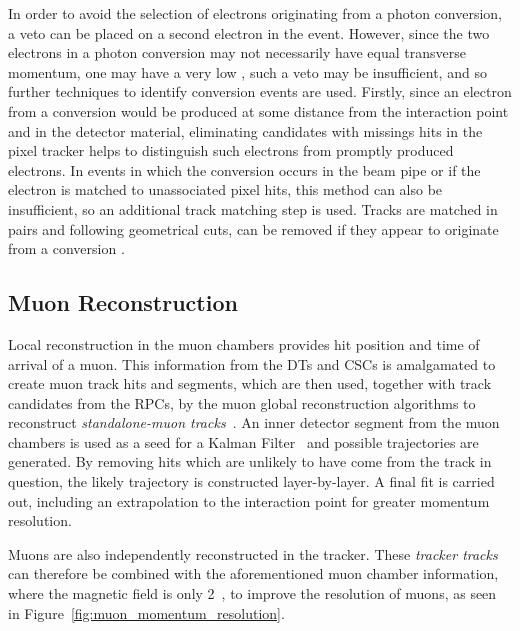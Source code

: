 In order to avoid the selection of electrons originating from a photon conversion, a veto can be placed on a
second electron in the event. However, since the two electrons in a photon conversion may not necessarily have
equal transverse momentum, \ie one may have a very low \pt, such a veto may be insufficient, and so further
techniques to identify conversion events are used. Firstly, since an electron from a conversion would be
produced at some distance from the interaction point and in the detector material, eliminating candidates with
missings hits in the pixel tracker helps to distinguish such electrons from promptly produced electrons. In
events in which the conversion occurs in the beam pipe or if the electron is matched to unassociated pixel
hits, this method can also be insufficient, so an additional track matching step is used. Tracks are matched
in pairs and following geometrical cuts, can be removed if they appear to originate from a conversion
\cite{electron_reconstruction}.

\subsection{Muon Reconstruction}
\label{ss:muon_reconstruction}
Local reconstruction in the muon chambers provides hit position and time of arrival of a muon. This
information from the DTs and CSCs is amalgamated to create muon track hits and segments, which are then used,
together with track candidates from the RPCs, by the muon global reconstruction algorithms to reconstruct
\textit{standalone-muon tracks}~\cite{muon_reconstruction}. An inner detector segment from the muon chambers
is used as a seed for a Kalman Filter~\cite{kalman_filter, Speer:927395} and possible trajectories are generated. By removing hits
which are unlikely to have come from the track in question, the likely trajectory is constructed
layer-by-layer. A final fit is carried out, including an extrapolation to the interaction point for greater
momentum resolution.

Muons are also independently reconstructed in the tracker. These \textit{tracker tracks} can therefore be
combined with the aforementioned muon chamber information, where the magnetic field is only 2~\tesla, to
improve the \pt resolution of muons, as seen in Figure~\ref{fig:muon_momentum_resolution}.

